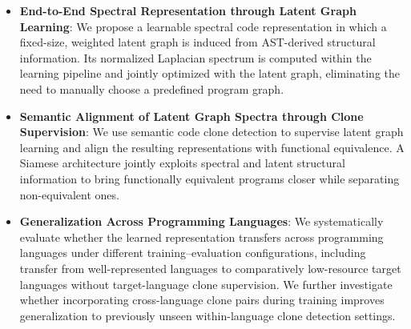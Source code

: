 \documentclass[authoryear,final,5p,times,twocolumn]{elsarticle}
\theoremstyle{plain}
\begin{document}
\begin{itemize}

    \item \textbf{End-to-End Spectral Representation through Latent Graph Learning}: We propose a learnable spectral code representation in which a fixed-size, weighted latent graph is induced from AST-derived structural information. Its normalized Laplacian spectrum is computed within the learning pipeline and jointly optimized with the latent graph, eliminating the need to manually choose a predefined program graph.

    \item \textbf{Semantic Alignment of Latent Graph Spectra through Clone Supervision}: We use semantic code clone detection to supervise latent graph learning and align the resulting representations with functional equivalence. A Siamese architecture jointly exploits spectral and latent structural information to bring functionally equivalent programs closer while separating non-equivalent ones.

    \item \textbf{Generalization Across Programming Languages}: We systematically evaluate whether the learned representation transfers across programming languages under different training--evaluation configurations, including transfer from well-represented languages to comparatively low-resource target languages without target-language clone supervision. We further investigate whether incorporating cross-language clone pairs during training improves generalization to previously unseen within-language clone detection settings.
\end{itemize}



\end{document}
